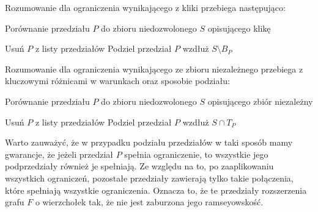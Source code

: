 Rozumowanie dla ograniczenia wynikającego z kliki przebiega następująco:
\begin{algorithm}[H]
  \caption{Porównanie przedziału $P$ do zbioru niedozwolonego $S$ opisującego klikę}
  \begin{algorithmic}
	  \STATE Usuń $P$ z listy przedziałów
	\ELSE
	  \STATE Podziel przedział $P$ wzdłuż $S \setminus B_P  $
  	\ENDIF
  \ENDIF  
  \end{algorithmic}
\end{algorithm}

Rozumowanie dla ograniczenia wynikającego ze zbioru niezależnego przebiega z kluczowymi różnicami w warunkach oraz sposobie podziału:

\begin{algorithm}[H]
  \caption{Porównanie przedziału $P$ do zbioru niedozwolonego $S$ opisującego zbiór niezależny}
  \begin{algorithmic}
	  \STATE Usuń $P$ z listy przedziałów
	\ELSE
	  \STATE Podziel przedział $P$ wzdłuż $S \cap T_P  $
  	\ENDIF
  \ENDIF  
  \end{algorithmic}
\end{algorithm}

Warto zauważyć, że w przypadku podziału przedziałów w taki sposób mamy gwarancje, że jeżeli przedział $P$ spełnia ograniczenie, to wszystkie jego podprzedziały również je spełniają. Ze względu na to, po zaaplikowaniu wszystkich ograniczeń, pozostałe przedziały zawierają tylko takie połączenia, które spełniają wszystkie ograniczenia. Oznacza to, że te przedziały rozszerzenia grafu $F$ o wierzchołek tak, że nie jest zaburzona jego ramseyowskość.  

